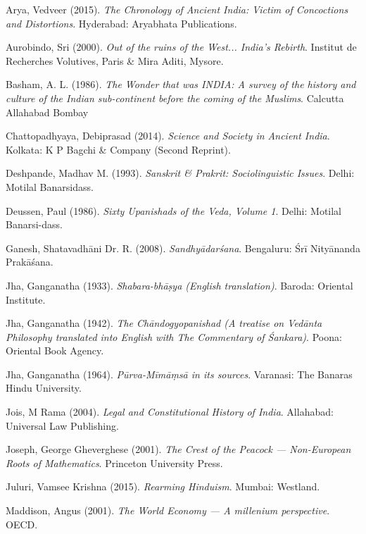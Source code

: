 \begin{thebibliography}{99}
\itemsep=3pt
Arya, Vedveer (2015). {\sl The Chronology of Ancient India: Victim of Concoctions and Distortions}. Hyderabad: Aryabhata Publications.

Aurobindo, Sri (2000). {\sl Out of the ruins of the West... India’s Rebirth}. Institut de Recherches Volutives, Paris \& Mira Aditi, Mysore.

Basham, A. L. (1986). {\sl The Wonder that was INDIA: A survey of the history and culture of the Indian sub-continent before the coming of the Muslims}. Calcutta Allahabad Bombay

Chattopadhyaya, Debiprasad (2014). {\sl Science and Society in Ancient India}. Kolkata: K P Bagchi \& Company (Second Reprint).

Deshpande, Madhav M. (1993). {\sl Sanskrit \& Prakrit: Sociolinguistic Issues}. Delhi: Motilal Banarsidass.

Deussen, Paul (1986). {\sl Sixty Upanishads of the Veda, Volume 1}. Delhi: Motilal Banarsi-dass.

Ganesh, Shatavadhāni Dr. R. (2008). {\sl Sandhyādarśana}. Bengaluru: Śrī Nityānanda Prakāśana.

Jha, Ganganatha (1933). {\sl Shabara-bhāṣya (English translation)}. Baroda: Oriental Institute.

Jha, Ganganatha (1942). {\sl The Chāndogyopanishad (A treatise on Vedānta Philosophy translated into English with The Commentary of Śankara)}. Poona: Oriental Book Agency.

Jha, Ganganatha (1964). {\sl Pūrva-Mīmāṃsā in its sources}. Varanasi: The Banaras Hindu University.

Jois, M Rama (2004). {\sl Legal and Constitutional History of India}. Allahabad: Universal Law Publishing.

Joseph, George Gheverghese (2001). {\sl The Crest of the Peacock --- Non-European Roots of Mathematics}. Princeton University Press.

Juluri, Vamsee Krishna (2015). {\sl Rearming Hinduism}. Mumbai: Westland.

Maddison, Angus (2001). {\sl The World Economy --- A millenium perspective}. OECD.


\end{thebibliography}
